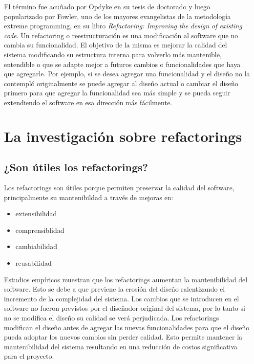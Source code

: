 El término fue acuñado por Opdyke en su tesis de doctorado y luego popularizado por Fowler, uno de
los mayores evangelistas de la metodología extreme programming, en su libro \textit{Refactoring:
Improving the design of existing code}. Un refactoring o reestructuración es una modificación al
software que no cambia su funcionalidad. El objetivo de la misma es mejorar la calidad del sistema
modificando su estructura interna para volverlo más mantenible, entendible o que se adapte mejor a
futuros cambios o funcionalidades que haya que agregarle. Por ejemplo, si se desea agregar una
funcionalidad y el diseño no la contempló originalmente se puede agregar al diseño actual o cambiar
el diseño primero para que agregar la funcionalidad sea más simple y se pueda seguir extendiendo el
software en esa dirección más fácilmente.







\section{La investigación sobre refactorings}

\subsection{¿Son útiles los refactorings?}
Los refactorings son útiles porque permiten preservar la calidad del software, principalmente su 
mantenibildad a través de mejoras en:

\begin{itemize}
    \item extensibilidad
    \item comprensiblidad
    \item cambiabilidad
    \item reusabilidad
\end{itemize}

Estudios empíricos muestran que los refactorings aumentan la mantenibilidad del software. Esto se
debe a que previene la erosión del diseño ralentizando el incremento de la complejidad del sistema.
Los cambios que se introducen en el software no fueron previstos por el diseñador original del
sistema, por lo tanto si no se modifica el diseño su calidad se verá perjudicada. Los refactorings
modifican el diseño antes de agregar las nuevas funcionalidades para que el diseño pueda adoptar los
nuevos cambios sin perder calidad. Esto permite mantener la mantenibilidad del sistema resultando
en una reducción de costos significativa para el proyecto.


